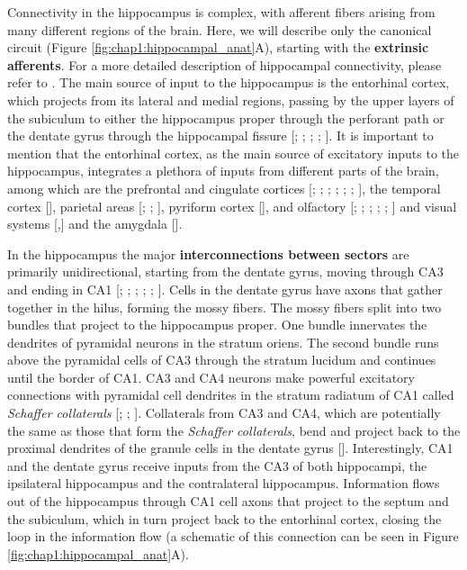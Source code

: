 Connectivity in the hippocampus is complex, with afferent fibers arising from many different regions of the brain. 
Here, we will describe only the canonical circuit (Figure \ref{fig:chap1:hippocampal_anat}A), starting with the \textbf{extrinsic afferents}. 
For a more detailed description of hippocampal connectivity, please refer to \cite{okeefebook}.
The main source of input to the hippocampus is the entorhinal cortex, which projects from its lateral and medial regions, passing by the upper layers of the subiculum to either the hippocampus proper through the perforant path or the dentate gyrus through the hippocampal fissure [\cite{nafstad1967}; \cite{hjorth1972}; \cite{vanhoesen1972}; \cite{hjorth1973}; \cite{vanhoesen1975b}].
It is important to mention that the entorhinal cortex, as the main source of excitatory inputs to the hippocampus, integrates a plethora of inputs from different parts of the brain, among which are the prefrontal and cingulate cortices [\cite{adey1951}; \cite{adeymeyer1952}; \cite{white1959}; \cite{cragg1965}; \cite{raisman1965}; \cite{mclardy1971}; \cite{leichnetz1975}], the temporal cortex [\cite{cragg1965}], parietal areas [\cite{pandya1969}; \cite{pandyavignolo1969}; \cite{petras1971}], pyriform cortex [\cite{powell1965}], and olfactory [\cite{cragg1960}; \cite{cragg1961}; \cite{heimer1968}; \cite{white1965}; \cite{price1971}; \cite{kerr1972}] and visual systems [\cite{casey1965},\cite{cuenod1965}] and the amygdala [\cite{krettek1974}].

In the hippocampus the major \textbf{interconnections between sectors} are primarily unidirectional, starting from the dentate gyrus, moving through CA3 and ending in CA1 [\cite{lorente1934}; \cite{raisman1965}; \cite{hjorth1973}; \cite{andersen1966}; \cite{fujita1962}; \cite{gloorverasperti1963}].   
Cells in the dentate gyrus have axons that gather together in the hilus, forming the mossy fibers. 
The mossy fibers split into two bundles that project to the hippocampus proper. 
One bundle innervates the dendrites of pyramidal neurons in the stratum oriens.
The second bundle runs above the pyramidal cells of CA3 through the stratum lucidum and continues until the border of CA1.
CA3 and CA4 neurons make powerful excitatory connections with pyramidal cell dendrites in the stratum radiatum of CA1 called \textit{Schaffer collaterals} [\cite{lorente1934}; \cite{hjorth1973}; \cite{andersen1966}]. 
Collaterals from CA3 and CA4, which are potentially the same as those that form the \textit{Schaffer collaterals}, bend and project back to the proximal dendrites of the granule cells in the dentate gyrus [\cite{zimmer1971}].
Interestingly, CA1 and the dentate gyrus receive inputs from the CA3 of both hippocampi, the ipsilateral hippocampus and the contralateral hippocampus.
Information flows out of the hippocampus through CA1 cell axons that project to the septum and the subiculum, which in turn project back to the entorhinal cortex, closing the loop in the information flow (a schematic of this connection can be seen in Figure \ref{fig:chap1:hippocampal_anat}A).

